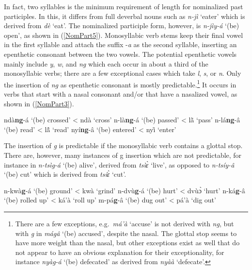 In fact, two syllables is the minimum requirement of length for nominalized past participles. In this, it differs from full deverbal nouns such as {\itshape n-jì} `eater' which is derived from {\itshape dè} `eat'. The nominalized participle form, however, is {\itshape n-jìy-á} `(be) open', as shown in (\ref{NomPart5}).  Monosyllabic verb stems keep their final vowel in the first syllable and attach the suffix -{\itshape a}  as the second syllable, inserting an epenthetic consonant between the two vowels. The potential epenthetic vowels mainly include {\itshape y}, {\itshape w}, and {\itshape ng} which each occur in about a third of the monosyllabic verbs; there are a few exceptional cases which take {\itshape l}, {\itshape s}, or {\itshape n}. Only the insertion of {\itshape ng} as epenthetic consonant is mostly predictable.\footnote{There are a few exceptions, e.g.\ {\itshape  má'à} `accuse' is not derived with {\itshape ng}, but with {\itshape g} in {\itshape mágâ} `(be) accused', despite the nasal. The glottal stop seems to have more weight than the nasal, but other exceptions exist as well that do not appear to have an obvious explanation for their exceptionality, for instance {\itshape nyàg-á} `(be) defecated' as derived from {\itshape nyàà} `defecate'.} It occurs in verbs that start with a nasal consonant and/or that have a nasalized vowel, as shown in (\ref{NomPart3}).

\begin{exe}
\ex\label{NomPart3} 
\begin{xlist}
\ex ndà{\bfseries ng}-á `(be) crossed' < ndà `cross'
\ex n-là{\bfseries ng}-á `(be) passed' < lã̀ `pass'
\ex n-lá{\bfseries ng}-â `(be) read' < lã̂ `read'
\ex nyí{\bfseries ng}-â `(be) entered' < nyi̊ `enter'
\end{xlist}
\end{exe}

\noindent The insertion of {\itshape g} is predictable if the monosyllabic verb contains a glottal stop. There are, however, many instances of g insertion which are not predictable, for instance in {\itshape n-tsìg-á} `(be) alive', derived from {\itshape tsìɛ̀} `live', as opposed to {\itshape n-tsíy-â} `(be) cut' which is derived from {\itshape tsíɛ̀} `cut'.

\begin{exe}
\ex\label{NomPart4} 
\begin{xlist}
\ex n-kwà{\bfseries g}-á `(be) ground' < kwà `grind'
\ex n-dvù{\bfseries g}-á `(be) hurt' < dvùɔ̀ `hurt'
\ex n-ká{\bfseries g}-â `(be) rolled up' < ká'à `roll up'
\ex m-pá{\bfseries g}-â `(be) dug out' < pá'à `dig out'
\end{xlist}
\end{exe}

